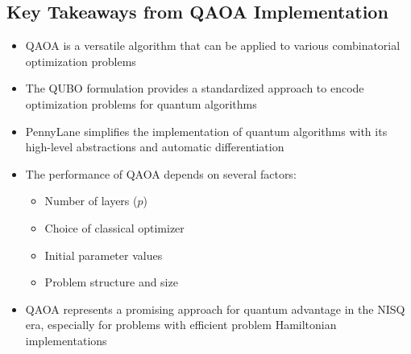 \vspace{0.3cm}


\subsection*{Key Takeaways from QAOA Implementation}

\begin{itemize}
  \item QAOA is a versatile algorithm that can be applied to various
    combinatorial optimization problems

  \item The QUBO formulation provides a standardized approach to encode
    optimization problems for quantum algorithms

  \item PennyLane simplifies the implementation of quantum algorithms with
    its high-level abstractions and automatic differentiation

  \item The performance of QAOA depends on several factors:
    \begin{itemize}
      \item Number of layers ($p$)

      \item Choice of classical optimizer

      \item Initial parameter values

      \item Problem structure and size
    \end{itemize}

  \item QAOA represents a promising approach for quantum advantage in the
    NISQ era, especially for problems with efficient problem Hamiltonian
    implementations
\end{itemize}

